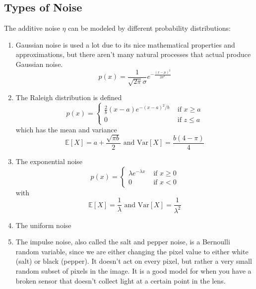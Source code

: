 \documentclass{article}
\begin{document}
  \subsection{Types of Noise}

    The additive noise $\eta$ can be modeled by different probability distributions: 
    \begin{enumerate}
      \item Gaussian noise is used a lot due to its nice mathematical properties and approximations, but there aren't many natural processes that actual produce Gaussian noise. 
      \[p(x) = \frac{1}{\sqrt{2 \pi} \sigma} e^{-\frac{(x - \mu)^2}{2 \sigma^2}} \]

      \item The Raleigh distribution is defined 
      \[p(x) = \begin{cases} \frac{2}{b} (x - a) e^{-(x - a)^2 / b} & \text{ if } x \geq a \\ 0 & \text{ if } z \leq a \end{cases}\]
      which has the mean and variance 
      \[\mathbb{E}[X] = a + \frac{\sqrt{\pi b}}{2} \text{ and } \mathrm{Var}[X] = \frac{b (4 - \pi)}{4}\]

      \item The exponential noise 
      \[p(x) = \begin{cases} \lambda e^{-\lambda x} & \text{ if } x \geq 0 \\ 0 & \text{ if } x < 0 \end{cases}\]
      with 
      \[\mathbb{E}[X] = \frac{1}{\lambda} \text{ and } \mathrm{Var}[X] = \frac{1}{\lambda^2}\]

      \item The uniform noise 
      \item The impulse noise, also called the salt and pepper noise, is a Bernoulli random variable, since we are either changing the pixel value to either white (salt) or black (pepper). It doesn't act on every pixel, but rather a very small random subset of pixels in the image. It is a good model for when you have a broken sensor that doesn't collect light at a certain point in the lens. 
    \end{enumerate}
\end{document}
